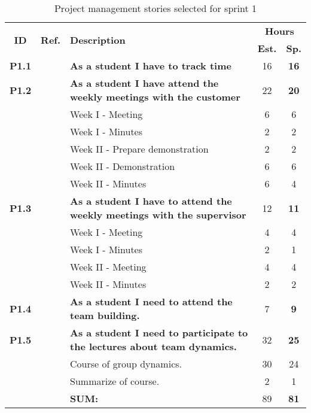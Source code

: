 \def\arraystretch{1.25}
 
\begin{longtable}{ccXcc}
\label{tab:sprint1storiesProcess}\\[-6mm]
\caption{Project management stories selected for sprint 1}\\[-4mm]

\toprule[0.5mm]
\multirow{2}{*}{\textbf{ID}} &
\multirow{2}{*}{\textbf{Ref.}} & \multirow{2}{*}{\textbf{Description}} & \multicolumn{2}{c}{\textbf{Hours}} \\
 					& & & \textbf{Est.} & \textbf{Sp.} \\
\midrule

\textbf{P1.1} 	&& {\bf  As a student I have to track time} 										& 	16	& \textbf{16} \\
	
\textbf{P1.2} 	&& {\bf As a student I have attend the weekly meetings with the customer} 			& 	22	& \textbf{20} \\
		&& Week I - Meeting							&  6 & 6 \\
		&& Week I - Minutes							&  2 & 2 \\
		&& Week II - Prepare demonstration			&  2 & 2 \\ 
		&& Week II - Demonstration					&  6 & 6 \\
		&& Week II - Minutes						&  6 & 4 \\


		
\textbf{P1.3} 	&& {\bf As a student I have to attend the weekly meetings with the supervisor} 		& 	12	& \textbf{11} \\
		&& Week I - Meeting							&  4 & 4 \\
		&& Week I - Minutes							&  2 & 1 \\
		&& Week II - Meeting						&  4 & 4 \\
		&& Week II - Minutes						&  2 & 2 \\


\textbf{P1.4} 	&& {\bf As a student I need to attend the team building.} 							& 		7	& \textbf{9} \\
		

\textbf{P1.5} 	&& {\bf As a student I need to participate to the lectures about team dynamics. } 	& 		32	& \textbf{25} \\
		&& Course of group dynamics.				& 30  & 24 \\
		&& Summarize of course.						& 2  & 1 \\				
				
\hline
				&& \textbf{SUM:}		&		89	& \textbf{81}
 \\																			
\bottomrule[0.5mm]
\end{longtable}

